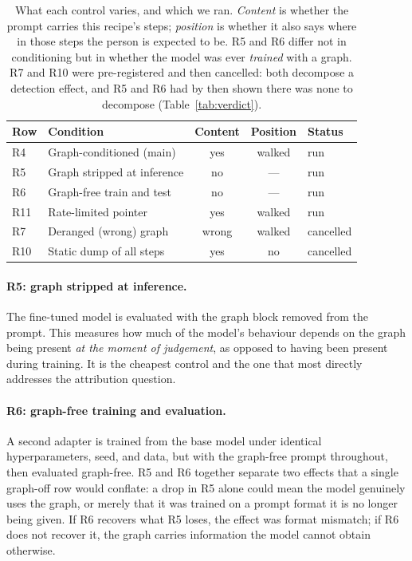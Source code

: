 \documentclass[10pt,twocolumn]{article}
\begin{document}
\begin{table}[t]
\centering\small
\setlength{\tabcolsep}{3.5pt}
\begin{tabular}{@{}llccl@{}}
\toprule
Row & Condition & Content & Position & Status \\
\midrule
R4  & Graph-conditioned (main)     & yes   & walked & run \\
R5  & Graph stripped at inference  & no    & ---    & run \\
R6  & Graph-free train and test    & no    & ---    & run \\
R11 & Rate-limited pointer         & yes   & walked & run \\
\midrule
R7  & Deranged (wrong) graph       & wrong & walked & cancelled \\
R10 & Static dump of all steps     & yes   & no     & cancelled \\
\bottomrule
\end{tabular}
\caption{What each control varies, and which we ran. \emph{Content} is whether
the prompt carries this recipe's steps; \emph{position} is whether it also says
where in those steps the person is expected to be. R5 and R6 differ not in
conditioning but in whether the model was ever \emph{trained} with a graph. R7
and R10 were pre-registered and then cancelled: both decompose a detection
effect, and R5 and R6 had by then shown there was none to decompose
(Table~\ref{tab:verdict}).}
\label{tab:controls}
\end{table}

\paragraph{R5: graph stripped at inference.} The fine-tuned model is evaluated
with the graph block removed from the prompt. This measures how much of the
model's behaviour depends on the graph being present \emph{at the moment of
judgement}, as opposed to having been present during training. It is the
cheapest control and the one that most directly addresses the attribution
question.

\paragraph{R6: graph-free training and evaluation.} A second adapter is
trained from the base model under identical hyperparameters, seed, and data, but
with the graph-free prompt throughout, then evaluated graph-free. R5 and R6
together separate two effects that a single graph-off row would conflate: a drop
in R5 alone could mean the model genuinely uses the graph, or merely that it was
trained on a prompt format it is no longer being given. If R6 recovers what R5
loses, the effect was format mismatch; if R6 does not recover it, the graph
carries information the model cannot obtain otherwise.
\end{document}
